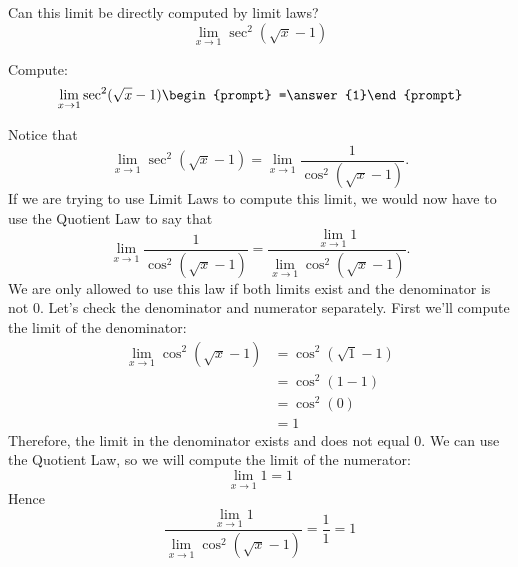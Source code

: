 \documentclass{ximera}
\begin{document}
\begin{question}
  Can this limit be directly computed by limit laws?
  \[
  \displaystyle\lim_{x\to 1}\sec^2(\sqrt{x}-1)
  \]
  \begin{multipleChoice}
  \end{multipleChoice}
  \begin{question}
    Compute:
    \[
    \displaystyle\lim_{x\to 1}\sec^2(\sqrt{x}-1)\begin{prompt} =\answer{1}\end{prompt}
    \]
    \begin{feedback}
      Notice that
      \[
      \displaystyle\lim_{x\to 1} \sec^2(\sqrt{x}-1) = \lim_{x\to 1} \frac{1}{\cos^2(\sqrt{x}-1)}.
      \]
      If we are trying to use Limit Laws to compute this limit, we
      would now have to use the Quotient Law to say that
      \[
      \displaystyle\lim_{x\to 1} \frac{1}{\cos^2(\sqrt{x}-1)} = \frac{ \lim_{x\to 1}1}{
        \lim_{x\to 1}\cos^2(\sqrt{x}-1)}.
      \]
      We are only allowed to use this law if both limits exist and the
      denominator is not $0$.  Let's check the denominator and numerator
      separately. First we'll compute the limit of the denominator:
      \begin{align*}
        \displaystyle\lim_{x\to 1}\cos^2(\sqrt{x}-1) &= 
        \cos^2(\sqrt{1}-1)\\
        &=\cos^2(1-1)\\
        &= \cos^2(0)\\
        &=1
      \end{align*}
      Therefore, the limit in the denominator exists and does not
      equal $0$. We can use the Quotient Law, so we will compute the limit of the numerator:
      \[
      \lim_{x\to 1}1=1
      \]
      Hence
      \[
      \frac{ \lim_{x\to 1}1}{ \lim_{x\to 1}\cos^2(\sqrt{x}-1)} =
      \frac{1}{1}=1
      \]
    \end{feedback}
  \end{question}
\end{question}
\end{document}

